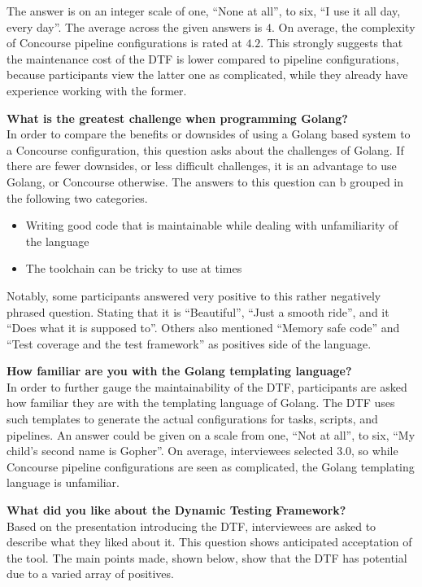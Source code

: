 The answer is on an integer scale of one, ``None at all'', to six, ``I use it all day, every day''.
The average across the given answers is $4$.
On average, the complexity of Concourse pipeline configurations is rated at $4.2$.
This strongly suggests that the maintenance cost of the DTF is lower compared to pipeline configurations, because participants view the latter one as complicated, while they already have experience working with the former.

\textbf{What is the greatest challenge when programming Golang?}\\
In order to compare the benefits or downsides of using a Golang based system to a Concourse configuration, this question asks about the challenges of Golang.
If there are fewer downsides, or less difficult challenges, it is an advantage to use Golang, or Concourse otherwise.
The answers to this question can b grouped in the following two categories.

\begin{itemize}
    \item Writing good code that is maintainable while dealing with unfamiliarity of the language
    \item The toolchain can be tricky to use at times
\end{itemize}

Notably, some participants answered very positive to this rather negatively phrased question.
Stating that it is ``Beautiful'', ``Just a smooth ride'', and it ``Does what it is supposed to''.
Others also mentioned ``Memory safe code'' and ``Test coverage and the test framework'' as positives side of the language.

\textbf{How familiar are you with the Golang templating language?}\\
In order to further gauge the maintainability of the DTF, participants are asked how familiar they are with the templating language of Golang.
The DTF uses such templates to generate the actual configurations for tasks, scripts, and pipelines.
An answer could be given on a scale from one, ``Not at all'', to six, ``My child's second name is Gopher''.
On average, interviewees selected $3.0$, so while Concourse pipeline configurations are seen as complicated, the Golang templating language is unfamiliar.

\textbf{What did you like about the Dynamic Testing Framework?}\\
Based on the presentation introducing the DTF, interviewees are asked to describe what they liked about it.
This question shows anticipated acceptation of the tool.
The main points made, shown below, show that the DTF has potential due to a varied array of positives.

